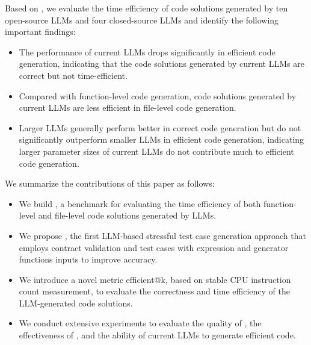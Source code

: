 Based on \bench, we evaluate the time efficiency of code solutions generated by ten open-source LLMs and four closed-source LLMs and identify the following important findings:
\begin{itemize}
    \item The performance of current LLMs drops significantly in efficient code generation, indicating that the code solutions generated by current LLMs are correct but not time-efficient.
    \item Compared with function-level code generation, code solutions generated by current LLMs are less efficient in file-level code generation.
    \item Larger LLMs generally perform better in correct code generation but do not significantly outperform smaller LLMs in efficient code generation, indicating larger parameter sizes of current LLMs do not contribute much to efficient code generation.
\end{itemize}





We summarize the contributions of this paper as follows:
\begin{itemize}
    \item We build \bench, a benchmark for evaluating the time efficiency of both function-level and file-level code solutions generated by LLMs.
    \item We propose \tool, the first LLM-based stressful test case generation approach that employs contract validation and test cases with expression and generator functions inputs to improve accuracy.
    \item We introduce a novel metric efficient@k, based on stable CPU instruction count measurement, to evaluate the correctness and time efficiency of the LLM-generated code solutions.
    \item We conduct extensive experiments to evaluate the quality of \bench, the effectiveness of \tool, and the ability of current LLMs to generate efficient code.
\end{itemize}
